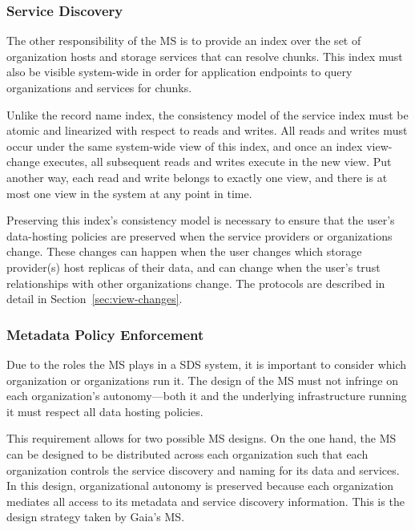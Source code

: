 \subsubsection{Service Discovery}

The other responsibility of the MS is to provide an index over the set of
organization hosts and storage services that can resolve chunks.  This index
must also be visible system-wide in order for application endpoints to query
organizations and services for chunks.

Unlike the record name index, the consistency model of the service
index must be atomic and linearized with respect to reads and writes.
All reads and writes must occur under the same system-wide view of this
index, and once an index view-change executes, all subsequent reads and writes
execute in the new view.  Put another way, each read and write belongs to
exactly one view, and there is at most one view in the system at any point in
time.

Preserving this index's consistency model is necessary to ensure that the user's
data-hosting policies are preserved when the service providers or organizations
change.  These changes can happen when the user changes which storage
provider(s) host replicas of their data, and can change when the user's trust
relationships with other organizations change.  The protocols are described in
detail in Section~\ref{sec:view-changes}.


\subsubsection{Metadata Policy Enforcement}

Due to the roles the MS plays in a SDS system, it is important to consider
which organization or organizations run it.  The design of the MS must not infringe on
each organization's autonomy---both it and the underlying infrastructure
running it must respect all data hosting policies.

This requirement allows for two possible MS designs.  On the one hand,
the MS can be designed to be distributed across each organization such that each
organization controls the service discovery and naming for its data and
services.  In this design, organizational autonomy is preserved because each
organization mediates all access to its metadata and service discovery
information.  This is the design strategy taken by
Gaia's MS.

